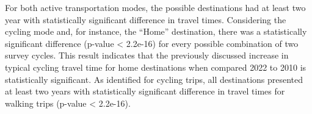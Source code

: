 \documentclass[preprint, 3p,
authoryear]{elsarticle} %
\begin{document}
For both active transportation modes, the possible destinations had at
least two year with statistically significant difference in travel
times. Considering the cycling mode and, for instance, the ``Home''
destination, there was a statistically significant difference (p-value
\textless{} 2.2e-16) for every possible combination of two survey
cycles. This result indicates that the previously discussed increase in
typical cycling travel time for home destinations when compared 2022 to
2010 is statistically significant. As identified for cycling trips, all
destinations presented at least two years with statistically significant
difference in travel times for walking trips (p-value \textless{}
2.2e-16).

\begin{table}
\centering
\caption{\label{tab:kruskal-walking}\label{tab:result-stats}P-values of the pairwise Wilcoxon test.}
\centering
{}
\end{table}
\end{document}
